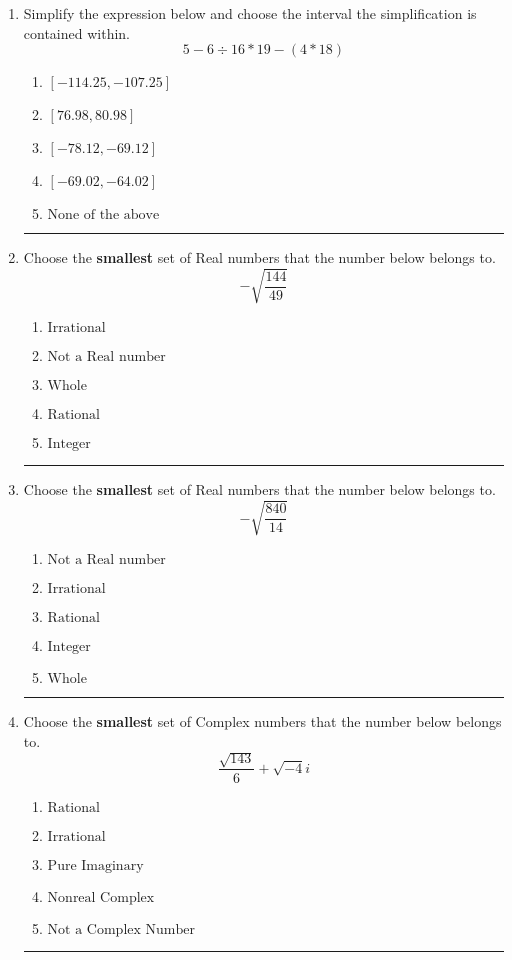 \documentclass[14pt]{extbook}
\newcommand{\litem}[1]{\item#1\hspace*{-1cm}\rule{\textwidth}{0.4pt}}
\begin{document}
\begin{enumerate}
{\begin{enumerate}[label=\Alph*.]
\end{enumerate} }
\litem{
Simplify the expression below and choose the interval the simplification is contained within.\[ 5 - 6 \div 16 * 19 - (4 * 18) \]\begin{enumerate}[label=\Alph*.]
\item \( [-114.25, -107.25] \)
\item \( [76.98, 80.98] \)
\item \( [-78.12, -69.12] \)
\item \( [-69.02, -64.02] \)
\item \( \text{None of the above} \)

\end{enumerate} }
\litem{
Choose the \textbf{smallest} set of Real numbers that the number below belongs to.\[ -\sqrt{\frac{144}{49}} \]\begin{enumerate}[label=\Alph*.]
\item \( \text{Irrational} \)
\item \( \text{Not a Real number} \)
\item \( \text{Whole} \)
\item \( \text{Rational} \)
\item \( \text{Integer} \)

\end{enumerate} }
\litem{
Choose the \textbf{smallest} set of Real numbers that the number below belongs to.\[ -\sqrt{\frac{840}{14}} \]\begin{enumerate}[label=\Alph*.]
\item \( \text{Not a Real number} \)
\item \( \text{Irrational} \)
\item \( \text{Rational} \)
\item \( \text{Integer} \)
\item \( \text{Whole} \)

\end{enumerate} }
\litem{
Choose the \textbf{smallest} set of Complex numbers that the number below belongs to.\[ \frac{\sqrt{143}}{6}+\sqrt{-4}i \]\begin{enumerate}[label=\Alph*.]
\item \( \text{Rational} \)
\item \( \text{Irrational} \)
\item \( \text{Pure Imaginary} \)
\item \( \text{Nonreal Complex} \)
\item \( \text{Not a Complex Number} \)


\end{enumerate}}
\end{enumerate}
\end{document}
